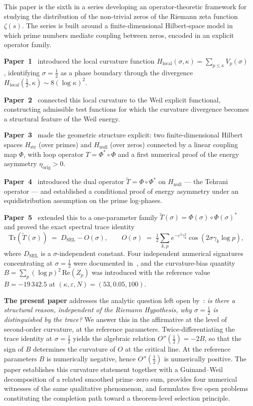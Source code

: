 \documentclass[11pt]{article}
\newcommand{\Hstr}{H_{\mathrm{str}}}
\newcommand{\Hnull}{H_{\mathrm{null}}}
\newcommand{\etaorig}{\eta_{\mathrm{orig}}}
\newcommand{\Tt}{\widetilde{T}}
\newcommand{\Hlocal}{H_{\mathrm{local}}}
\newcommand{\DSEL}{D_{\mathrm{SEL}}}
\begin{document}
This paper is the sixth in a series developing an operator-theoretic
framework for studying the distribution of the non-trivial zeros of
the Riemann zeta function $\zeta(s)$.
The series is built around a finite-dimensional Hilbert-space model in
which prime numbers mediate coupling between zeros, encoded in an
explicit operator family.

\textbf{Paper~1}~\cite{Paper1} introduced the local curvature function
$\Hlocal(\sigma,\kappa)=\sum_{p\le\kappa}V_p(\sigma)$, identifying
$\sigma=\tfrac12$ as a phase boundary through the divergence
$\Hlocal(\tfrac12,\kappa)\sim 8(\log\kappa)^2$.

\textbf{Paper~2}~\cite{Paper2} connected this local curvature to the
Weil explicit functional, constructing admissible test functions
for which the curvature divergence becomes a structural feature of
the Weil energy.

\textbf{Paper~3}~\cite{Paper3} made the geometric structure explicit:
two finite-dimensional Hilbert spaces $\Hstr$ (over primes) and
$\Hnull$ (over zeros) connected by a linear coupling map $\Phi$, with
loop operator $T=\Phi^*\circ\Phi$ and a first numerical proof of the
energy asymmetry $\etaorig>0$.

\textbf{Paper~4}~\cite{Paper4} introduced the dual operator
$\Tt=\Phi\circ\Phi^*$ on $\Hnull$ --- the Tehrani operator --- and
established a conditional proof of energy asymmetry under an
equidistribution assumption on the prime log-phases.

\textbf{Paper~5}~\cite{Paper5} extended this to a one-parameter
family $\Tt(\sigma)=\Phi(\sigma)\circ\Phi(\sigma)^*$ and proved the
exact spectral trace identity
\[
\mathrm{Tr}(\Tt(\sigma)) \;=\; \DSEL - O(\sigma),
\qquad
O(\sigma) \;=\; \tfrac12\sum_{k,p} e^{-\varepsilon^2\gamma_k^2}
                \cos(2\sigma\gamma_k\log p),
\]
where $\DSEL$ is a $\sigma$-independent constant.
Four independent numerical signatures concentrating at $\sigma=\tfrac12$
were documented in~\cite{Paper4,Paper5}, and the curvature-bias quantity
$B=\sum_p(\log p)^2\,\mathrm{Re}(Z_p)$ was introduced with the reference
value $B=-19\,342.5$ at $(\kappa,\varepsilon,N)=(53,0.05,100)$.

\textbf{The present paper} addresses the analytic question left open
by~\cite{Paper5}: \emph{is there a structural reason, independent of
the Riemann Hypothesis, why $\sigma=\tfrac12$ is distinguished by the
trace?}
We answer this in the affirmative at the level of second-order
curvature, at the reference parameters.
Twice-differentiating the trace identity at $\sigma=\tfrac12$ yields
the algebraic relation $O''(\tfrac12)=-2B$, so that the sign of $B$
determines the curvature of $O$ at the critical line.
At the reference parameters $B$ is numerically negative, hence
$O''(\tfrac12)$ is numerically positive.
The paper establishes this curvature statement together with a
Guinand--Weil decomposition of a related smoothed prime--zero sum,
provides four numerical witnesses of the same qualitative phenomenon,
and formulates five open problems constituting the completion path
toward a theorem-level selection principle.
\end{document}
